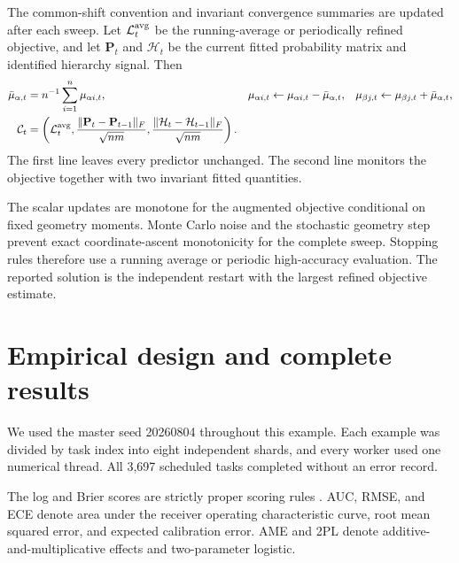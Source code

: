 \documentclass[
  12pt]{article}
\theoremstyle{definition}
\theoremstyle{plain}
\newcommand{\bP}{\mathbf P}
\begin{document}
The common-shift convention and invariant convergence summaries are updated after each sweep. Let $\mathcal L_t^{\rm avg}$ be the running-average or periodically refined objective, and let $\bP_t$ and $\mathcal H_t$ be the current fitted probability matrix and identified hierarchy signal. Then
\begin{subequations}\label{supp:centering-stopping}
	\begin{align}
		\bar\mu_{\alpha,t}
		&=n^{-1}\sum_{i=1}^n\mu_{\alpha i,t},
		&
		\mu_{\alpha i,t}&\leftarrow\mu_{\alpha i,t}-\bar\mu_{\alpha,t},
		&
		\mu_{\beta j,t}&\leftarrow\mu_{\beta j,t}+\bar\mu_{\alpha,t},\label{supp:centering-update}\\
		\mathcal C_t
		&=\left(
		\mathcal L_t^{\rm avg},
		\frac{\|\bP_t-\bP_{t-1}\|_F}{\sqrt{nm}},
		\frac{\|\mathcal H_t-\mathcal H_{t-1}\|_F}{\sqrt{nm}}
		\right).\label{supp:stopping-summary}
	\end{align}
\end{subequations}
The first line leaves every predictor unchanged. The second line monitors the objective together with two invariant fitted quantities.

The scalar updates are monotone for the augmented objective conditional on fixed geometry moments. Monte Carlo noise and the stochastic geometry step prevent exact coordinate-ascent monotonicity for the complete sweep. Stopping rules therefore use a running average or periodic high-accuracy evaluation. The reported solution is the independent restart with the largest refined objective estimate.





\section{Empirical design and complete results}
\label{supp:empirical}

We used the master seed \textsf{20260804} throughout this example. Each example was divided by task index into eight independent shards, and every worker used one numerical thread. All 3,697 scheduled tasks completed without an error record. 

The log and Brier scores are strictly proper scoring rules \citep{gneiting_2007_StrictlyProperScoring}. AUC, RMSE, and ECE denote area under the receiver operating characteristic curve, root mean squared error, and expected calibration error. AME and 2PL denote additive-and-multiplicative effects and two-parameter logistic.
\end{document}

